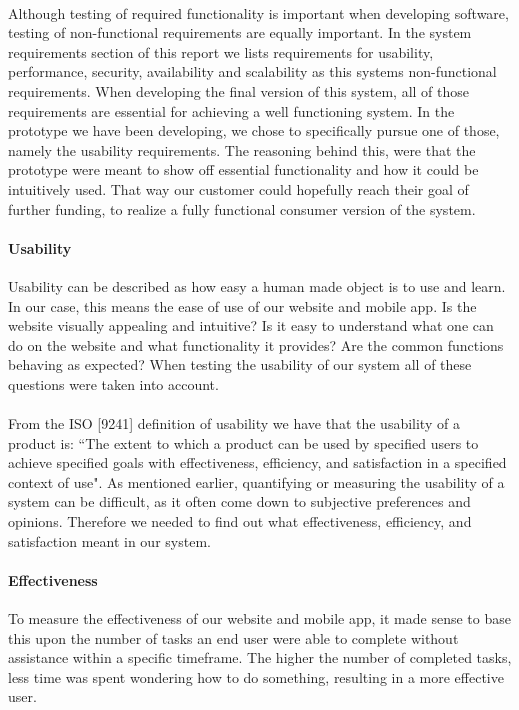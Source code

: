 \paragraph{} Although testing of required functionality is important when developing software, testing of non-functional requirements are equally important. In the system requirements section of this report we lists requirements for usability, performance, security, availability and scalability as this systems non-functional requirements. When developing the final version of this system, all of those requirements are essential for achieving a well functioning system. In the prototype we have been developing, we chose to specifically pursue one of those, namely the usability requirements. The reasoning behind this, were that the prototype were meant to show off essential functionality and how it could be intuitively used. That way our customer could hopefully reach their goal of further funding, to realize a fully functional consumer version of the system. 

\paragraph{Usability} Usability can be described as how easy a human made object is to use and learn. In our case, this means the ease of use of our website and mobile app. Is the website visually appealing and intuitive? Is it easy to understand what one can do on the website and what functionality it provides? Are the common functions behaving as expected? When testing the usability of our system all of these questions were taken into account.

\paragraph{} From the ISO [9241]  definition of usability we have that the usability of a product is:
“The extent to which a product can be used by specified users to achieve specified goals with effectiveness, efficiency, and satisfaction in a specified context of use". As mentioned earlier, quantifying or measuring the usability of a system can be difficult, as it often come down to subjective preferences and opinions. Therefore we needed to find out what effectiveness, efficiency, and satisfaction meant in our system.

\paragraph{Effectiveness} To measure the effectiveness of our website and mobile app, it made sense to base this upon the number of tasks an end user were able to complete without assistance within a specific timeframe. The higher the number of completed tasks, less time was spent wondering how to do something, resulting in a more effective user. 

